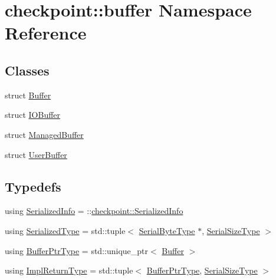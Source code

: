 \hypertarget{namespacecheckpoint_1_1buffer}{}\section{checkpoint\+:\+:buffer Namespace Reference}
\label{namespacecheckpoint_1_1buffer}
\subsection*{Classes}
\begin{DoxyCompactItemize}
\item 
struct \hyperlink{structcheckpoint_1_1buffer_1_1_buffer}{Buffer}
\item 
struct \hyperlink{structcheckpoint_1_1buffer_1_1_i_o_buffer}{I\+O\+Buffer}
\item 
struct \hyperlink{structcheckpoint_1_1buffer_1_1_managed_buffer}{Managed\+Buffer}
\item 
struct \hyperlink{structcheckpoint_1_1buffer_1_1_user_buffer}{User\+Buffer}
\end{DoxyCompactItemize}
\subsection*{Typedefs}
\begin{DoxyCompactItemize}
\item 
using \hyperlink{namespacecheckpoint_1_1buffer_a7c7e5ecf5f571c68818f608989764ab7}{Serialized\+Info} = \+::\hyperlink{structcheckpoint_1_1_serialized_info}{checkpoint\+::\+Serialized\+Info}
\item 
using \hyperlink{namespacecheckpoint_1_1buffer_a641e3b257ab05f90165ed4139db8a84a}{Serialized\+Type} = std\+::tuple$<$ \hyperlink{namespacecheckpoint_ae57f01cdc0b81776c23b6c7c934c58f5}{Serial\+Byte\+Type} $\ast$, \hyperlink{namespacecheckpoint_a083f6674da3f94c2901b18c6d238217c}{Serial\+Size\+Type} $>$
\item 
using \hyperlink{namespacecheckpoint_1_1buffer_ac52efd71a39aafa616d8214a7ff96ace}{Buffer\+Ptr\+Type} = std\+::unique\+\_\+ptr$<$ \hyperlink{structcheckpoint_1_1buffer_1_1_buffer}{Buffer} $>$
\item 
using \hyperlink{namespacecheckpoint_1_1buffer_a4e930737a23dabd17333a8ea48c8edff}{Impl\+Return\+Type} = std\+::tuple$<$ \hyperlink{namespacecheckpoint_1_1buffer_ac52efd71a39aafa616d8214a7ff96ace}{Buffer\+Ptr\+Type}, \hyperlink{namespacecheckpoint_a083f6674da3f94c2901b18c6d238217c}{Serial\+Size\+Type} $>$
\end{DoxyCompactItemize}


